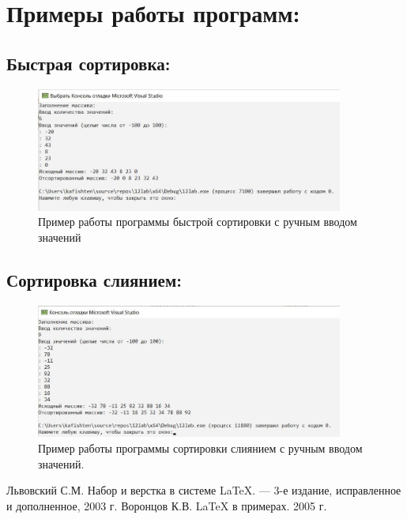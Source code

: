 \documentclass[12pt,a4paper]{scrartcl}
\begin{document}
\section{Примеры работы программ:}
\subsection{Быстрая сортировка: }
\label{sec:pictures1}
\begin{figure}[H]
	\centering
	\includegraphics[width=0.9\textwidth]{1.jpg}
	\caption{Пример работы программы быстрой сортировки с ручным вводом значений}\label{fig:par}
\end{figure}

\subsection{Сортировка слиянием: }
\begin{figure}[H]
  \centering
  \includegraphics[width=0.9\textwidth]{2.jpg}
  \caption{Пример работы программы сортировки слиянием с ручным вводом значений.}
  \label{fig:par2}
\end{figure}





\begin{thebibliography}{9}
\label{sec:biblio}
Львовский С.М. Набор и верстка в системе \LaTeX{}. \newblock --- 3-е издание, исправленное и дополненное, 2003 г.
Воронцов К.В. \LaTeX{} в примерах. 2005 г.
\end{thebibliography}
\end{document}
